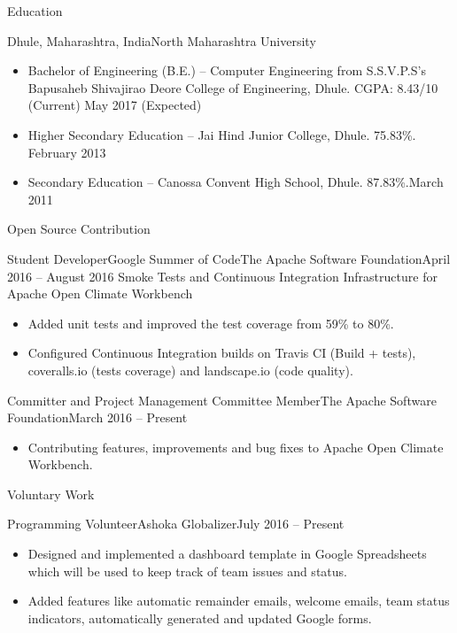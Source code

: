 \documentclass[]{mcdowellcv}
\begin{document}
	\makeheader

	\begin{cvsection}{Education}
		\begin{cvsubsection}{Dhule, Maharashtra, India}{North Maharashtra University}{}
			\begin{itemize}
				\item Bachelor of Engineering (B.E.) -- Computer Engineering from S.S.V.P.S's Bapusaheb Shivajirao Deore College of Engineering, Dhule. CGPA: 8.43/10 (Current) \hfill May 2017 (Expected)
				\item Higher Secondary Education -- Jai Hind Junior College, Dhule. 75.83\%. \hfill February 2013
				\item Secondary Education -- Canossa Convent High School, Dhule. 87.83\%.\hfill March 2011
			\end{itemize}
		\end{cvsubsection}
	\end{cvsection}

	\begin{cvsection}{Open Source Contribution}
		\begin{cvsubsection}[2]{Student Developer\linebreak Google Summer of Code}{The Apache Software Foundation}{April 2016 -- August 2016}
			Smoke Tests and Continuous Integration Infrastructure for Apache Open Climate Workbench
			\begin{itemize}
				\item Added unit tests and improved the test coverage from 59\% to 80\%.
				\item Configured Continuous Integration builds on Travis CI (Build + tests), coveralls.io (tests coverage) and landscape.io (code quality).
			\end{itemize}
		\end{cvsubsection}
		
		\begin{cvsubsection}[2]{Committer and Project Management Committee Member}{The Apache Software Foundation}{March 2016 -- Present}
			\begin{itemize}
				\item Contributing features, improvements and bug fixes to Apache Open Climate Workbench.
			\end{itemize}
		\end{cvsubsection}
	\end{cvsection}
	\begin{cvsection}{Voluntary Work}
		\begin{cvsubsection}{Programming Volunteer}{Ashoka Globalizer}{July 2016 -- Present}
			\begin{itemize}
				\item Designed and implemented a dashboard template in Google Spreadsheets which will be used to keep track of team issues and status.
				\item Added features like automatic remainder emails, welcome emails, team status indicators, automatically generated and updated Google forms.
			\end{itemize}
		\end{cvsubsection}
	\end{cvsection}
	
\end{document}
